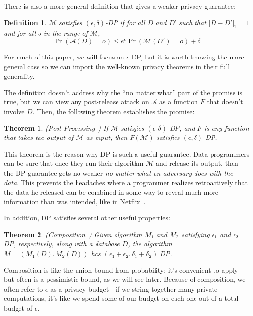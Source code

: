 \documentclass[11pt]{report}
\newtheorem{theorem}{Theorem}
\newtheorem{defn}{Definition}
\begin{document}
There is also a more general definition that gives a weaker privacy guarantee: 

\begin{defn}
$\mathcal{M}$ satisfies $(\epsilon, \delta)$-DP if for all $D$ and $D'$ such that $|D-D'|_1=1$ and for all $o$ in the range of $\mathcal{M}$, 
\[\Pr\left(\mathcal{A}(D) = o \right) \leq e^{\epsilon} \Pr\left(\mathcal{M}(D')=o \right) + \delta\]
\end{defn}

For much of this paper, we will focus on $\epsilon$-DP, but it is worth knowing the more general case so we can import the well-known privacy theorems in their full generality.

The definition doesn't address why the ``no matter what'' part of the promise is true, but we can view any post-release attack on $\mathcal{A}$ as a function $F$ that doesn't involve $D$. Then, the following theorem establishes the promise:

\begin{theorem}
(Post-Processing~\cite{Dwork:2006}) If $\mathcal{M}$ satisfies $(\epsilon, \delta)$-DP, and $F$ is any function that takes the output of $\mathcal{M}$ as input, then $F(\mathcal{M})$ satisfies $(\epsilon, \delta)$-DP.
\end{theorem}
This theorem is the reason why DP is such a useful guarantee. Data programmers can be sure that once they run their algorithm $\mathcal{M}$ and release its output, then the DP guarantee gets no weaker \emph{no matter what an adversary does with the data}. This prevents the headaches where a programmer realizes retroactively that the data he released can be combined in some way to reveal much more information than was intended, like in Netflix~\cite{Narayanan:2006}.

In addition, DP satisfies several other useful properties:

\begin{theorem} \label{thm:comp}
(Composition~\cite{Dwork:2006}) Given algorithm $M_1$ and $M_2$ satisfying $\epsilon_1$ and $\epsilon_2$ DP, respectively, along with a database $D$, the algorithm $M = (M_1(D), M_2(D))$ has $(\epsilon_1+\epsilon_2, \delta_1+\delta_2)$ DP.
\end{theorem}
Composition is like the union bound from probability; it's convenient to apply but often is a pessimistic bound, as we will see later. Because of composition, we often refer to $\epsilon$ as a privacy budget---if we string together many private computations, it's like we spend some of our budget on each one out of a total budget of $\epsilon$.
\end{document}

